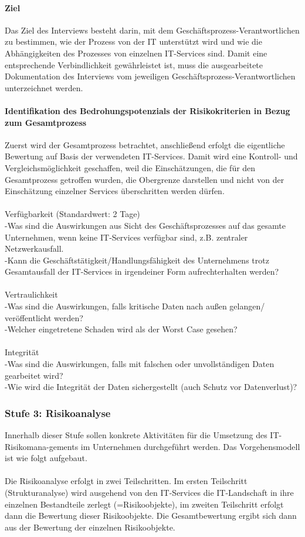 \paragraph{Ziel}
Das Ziel des Interviews besteht darin, mit dem Geschäftsprozess-Verantwortlichen zu bestimmen, wie der Prozess von der IT unterstützt wird und wie die Abhängigkeiten des Prozesses von einzelnen IT-Services sind. Damit eine entsprechende Verbindlichkeit gewährleistet ist, muss die ausgearbeitete Dokumentation des Interviews vom jeweiligen Geschäftsprozess-Verantwortlichen unterzeichnet werden.

\paragraph{Identifikation des Bedrohungspotenzials der Risikokriterien in Bezug zum Gesamtprozess}
Zuerst wird der Gesamtprozess betrachtet, anschließend erfolgt die eigentliche Bewertung auf Basis der verwendeten IT-Services. Damit wird eine Kontroll- und Vergleichsmöglichkeit geschaffen, weil die Einschätzungen, die für den Gesamtprozess getroffen wurden, die Obergrenze darstellen und nicht von der Einschätzung einzelner Services überschritten werden dürfen.\\
\\Verfügbarkeit (Standardwert: 2 Tage)
\\-Was sind die Auswirkungen aus Sicht des Geschäftsprozesses auf das gesamte Unternehmen, wenn keine IT-Services verfügbar sind, z.B. zentraler Netzwerkausfall.\\
-Kann die Geschäftstätigkeit/Handlungsfähigkeit des Unternehmens trotz Gesamtausfall der IT-Services in irgendeiner Form aufrechterhalten werden?\\
\\Vertraulichkeit
\\-Was sind die Auswirkungen, falls kritische Daten nach außen gelangen/ veröffentlicht werden?
\\-Welcher eingetretene Schaden wird als der Worst Case gesehen?\\
\\Integrität
\\-Was sind die Auswirkungen, falls mit falschen oder unvollständigen Daten gearbeitet wird?
\\-Wie wird die Integrität der Daten sichergestellt (auch Schutz vor Datenverlust)?
\subsubsection{Stufe 3: Risikoanalyse}
Innerhalb dieser Stufe sollen konkrete Aktivitäten für die Umsetzung des IT-Risikomana-gements im Unternehmen durchgeführt werden. Das Vorgehensmodell ist wie folgt aufgebaut.\\
\\Die Risikoanalyse erfolgt in zwei Teilschritten. Im ersten Teilschritt (Strukturanalyse) wird ausgehend von den IT-Services die IT-Landschaft in ihre einzelnen Bestandteile zerlegt (=Risikoobjekte), im zweiten Teilschritt erfolgt dann die Bewertung dieser Risikoobjekte. Die Gesamtbewertung ergibt sich dann aus der Bewertung der einzelnen Risikoobjekte.
